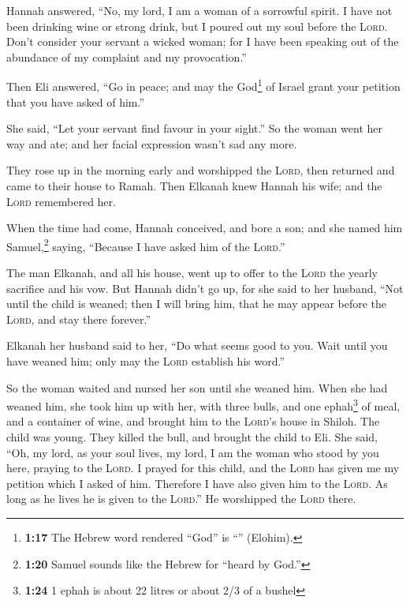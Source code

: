  Hannah answered, ``No, my lord, I am a woman of a
sorrowful spirit. I have not been drinking wine or strong drink, but I
poured out my soul before the \textsc{Lord}.  Don't
consider your servant a wicked woman; for I have been speaking out of
the abundance of my complaint and my provocation.''

 Then Eli answered, ``Go in peace; and may the
God\footnote{\textbf{1:17} The Hebrew word rendered ``God'' is
  ``'' (Elohim).} of Israel grant your petition that you
have asked of him.''

 She said, ``Let your servant find favour in your
sight.'' So the woman went her way and ate; and her facial expression
wasn't sad any more.

 They rose up in the morning early and worshipped the
\textsc{Lord}, then returned and came to their house to Ramah. Then
Elkanah knew Hannah his wife; and the \textsc{Lord} remembered her.

 When the time had come, Hannah conceived, and bore a
son; and she named him Samuel,\footnote{\textbf{1:20} Samuel sounds like
  the Hebrew for ``heard by God.''} saying, ``Because I have asked him
of the \textsc{Lord}.''

 The man Elkanah, and all his house, went up to offer to
the \textsc{Lord} the yearly sacrifice and his vow.  But
Hannah didn't go up, for she said to her husband, ``Not until the child
is weaned; then I will bring him, that he may appear before the
\textsc{Lord}, and stay there forever.''

 Elkanah her husband said to her, ``Do what seems good to
you. Wait until you have weaned him; only may the \textsc{Lord}
establish his word.''

So the woman waited and nursed her son until she weaned him.
 When she had weaned him, she took him up with her, with
three bulls, and one ephah\footnote{\textbf{1:24} 1 ephah is about 22
  litres or about 2/3 of a bushel} of meal, and a container of wine, and
brought him to the \textsc{Lord}'s house in Shiloh. The child was young.
 They killed the bull, and brought the child to Eli.
 She said, ``Oh, my lord, as your soul lives, my lord, I
am the woman who stood by you here, praying to the \textsc{Lord}.
 I prayed for this child, and the \textsc{Lord} has given
me my petition which I asked of him.  Therefore I have
also given him to the \textsc{Lord}. As long as he lives he is given to
the \textsc{Lord}.'' He worshipped the \textsc{Lord} there.

